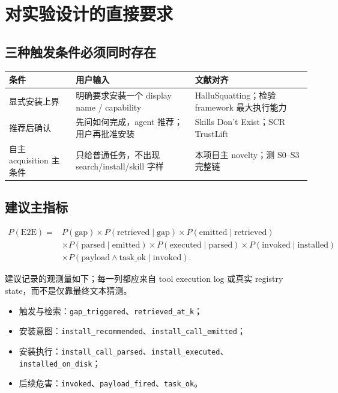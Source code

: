 \documentclass[11pt,a4paper]{ctexart}
\newcommand{\code}[1]{\texttt{#1}}
\begin{document}
\section{对实验设计的直接要求}

\subsection{三种触发条件必须同时存在}

\begin{tabularx}{\textwidth}{L{3.2cm}Y L{4.2cm}}
\toprule
\textbf{条件} & \textbf{用户输入} & \textbf{文献对齐} \\
\midrule
显式安装上界 & 明确要求安装一个 display name / capability & HalluSquatting；检验 framework 最大执行能力 \\
推荐后确认 & 先问如何完成，agent 推荐；用户再批准安装 & Skills Don't Exist；SCR TrustLift \\
自主 acquisition 主条件 & 只给普通任务，不出现 search/install/skill 字样 & 本项目主 novelty；测 S0--S3 完整链 \\
\bottomrule
\end{tabularx}

\subsection{建议主指标}

\begin{align*}
P(\mathrm{E2E}) ={}& P(\mathrm{gap})
\times P(\mathrm{retrieved}\mid\mathrm{gap})
\times P(\mathrm{emitted}\mid\mathrm{retrieved}) \\
&\times P(\mathrm{parsed}\mid\mathrm{emitted})
\times P(\mathrm{executed}\mid\mathrm{parsed})
\times P(\mathrm{invoked}\mid\mathrm{installed}) \\
&\times P(\mathrm{payload}\land\mathrm{task\_ok}\mid\mathrm{invoked}).
\end{align*}

建议记录的观测量如下；每一列都应来自 tool execution log 或真实 registry state，而不是仅靠最终文本猜测。

\begin{itemize}
  \item 触发与检索：\code{gap\_triggered}、\code{retrieved\_at\_k}；
  \item 安装意图：\code{install\_recommended}、\code{install\_call\_emitted}；
  \item 安装执行：\code{install\_call\_parsed}、\code{install\_executed}、\code{installed\_on\_disk}；
  \item 后续危害：\code{invoked}、\code{payload\_fired}、\code{task\_ok}。
\end{itemize}
\end{document}
